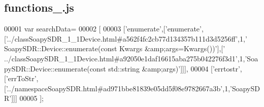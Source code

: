 \subsection{functions\+\_.\+js}
\label{functions__3_8js_source}

\begin{DoxyCode}
00001 var searchData=
00002 [
00003   [\textcolor{stringliteral}{'enumerate'},[\textcolor{stringliteral}{'enumerate'},[\textcolor{stringliteral}{'../classSoapySDR\_1\_1Device.html#a562f4fc2cb77d134357b111d3d5256ff'},1,\textcolor{stringliteral}{'
      SoapySDR::Device::enumerate(const Kwargs &amp;args=Kwargs())'}],[\textcolor{stringliteral}{'
      ../classSoapySDR\_1\_1Device.html#a92050e1daf16615aba275b042276f3d1'},1,\textcolor{stringliteral}{'SoapySDR::Device::enumerate(const std::string &amp;args)'}]]],
00004   [\textcolor{stringliteral}{'errtostr'},[\textcolor{stringliteral}{'errToStr'},[\textcolor{stringliteral}{'../namespaceSoapySDR.html#ad971bbe81839e05dd5f08e9782667a3b'},1,\textcolor{stringliteral}{'SoapySDR'}]]]
00005 ];
\end{DoxyCode}
